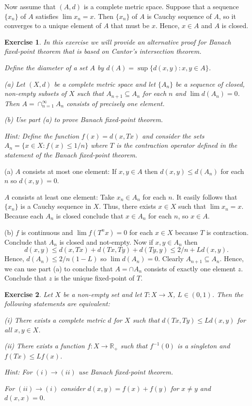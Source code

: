\documentclass[letter,11pt]{article}
\newtheorem{exercise}{Exercise}[section]
\begin{document}
Now assume that $(A,d)$ is a complete metric space. Suppose that a sequence $\{x_{n} \}$ of $A$ satisfies $\lim x_{n} =x$. Then $\{x_{n} \}$ of $A$  is Cauchy sequence of $A$, so it converges to a unique element of $A$ that must be $x$. Hence, $x \in A$ and $A$ is closed. 


\begin{exercise}
   In this exercise we will provide an alternative proof for Banach fixed-point theorem that is based on Cantor's intersection theorem. 


Define the diameter of a set $A$ by $d(A) = \sup \{ d(x,y): x,y \in A\}$.

   (a) Let $(X,d)$ be a complete metric space and let $\{A_{n}\}$ be a sequence of closed, non-empty subsets of $X$ such that $A_{n+1} \subseteq A_{n}$ for each $n$ and $\lim d(A_{n}) = 0 $. Then $A = \cap _{n=1}^{\infty} A_{n}$ consists of precisely one element. 


(b) Use part (a) to prove Banach fixed-point theorem. 

Hint: Define the function $f(x) = d(x,Tx)$ and consider the sets $A_{n} = \{x \in X: f(x) \leq 1/n \} $ where $T$ is the contraction operator defined in the statement of the Banach fixed-point theorem. 
\end{exercise}


(a) $A$ consists at most one element: If $x,y \in A$ then $d(x,y) \leq d(A_{n})$ for each $n$ so $d(x,y)=0$. 

$A$ consists at least one element: Take $x_{n} \in A_{n}$ for each $n$. It easily follows that $\{x_{n} \}$ is a Cauchy sequence in $X$. Thus, there exists $x \in X$ such that $\lim x_{n} =x$. Because  each $A_{n}$ is closed conclude that $x \in A_{n}$ for each $n$, so $x \in A$. 

(b) $f$ is continuous and $ \lim f(T^{n}x) =0$ for each $x \in X$ because $T$ is contraction. Conclude that $A_{n}$ is closed and not-empty. Now if $x,y \in A_{n}$ then 
$$ d(x,y) \leq d(x,Tx) + d(Tx,Ty) + d(Ty,y) \leq 2/n  + L d(x,y).$$
Hence, $d(A_{n}) \leq 2/n(1-L)$ so $\lim d(A_{n}) =0$. Clearly $A_{n+1} \subseteq A_{n}$. Hence, we can use part (a) to conclude that $A = \cap A_{n}$ consists of exactly one element $z$. Conclude that $z$ is the unique fixed-point of $T$.  



\begin{exercise}
     Let $X$ be a non-empty set and let $T: X \rightarrow X$, $L \in (0,1)$. Then the following statements are equivalent: 

     (i) There exists a complete metric $d$ for $X $ such that $d(Tx,Ty) \leq L d(x,y)$ for all $x,y \in X$. 

     (ii) There exists a function $f:X \rightarrow \mathbb{R}_{+}$ such that $f^{-1}(0)$ is a singleton and $f(Tx) \leq L f(x)$. 

     Hint: For $(i) \rightarrow (ii)$ use Banach fixed-point theorem. 

     For $(ii) \rightarrow (i)$ consider $d(x,y) = f(x) + f(y)$ for $x \neq y$ and $d(x,x) = 0$. 
\end{exercise}
\end{document}
